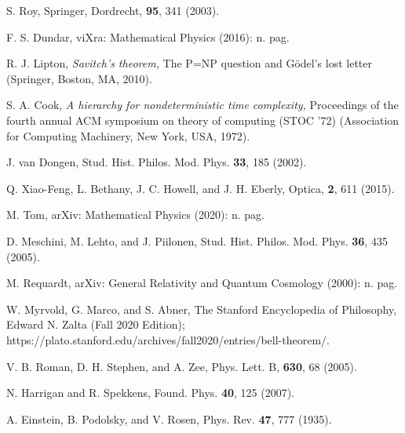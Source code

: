 \documentclass{article}
\begin{document}
\begin{thebibliography}{6}
S. Roy,   Springer, Dordrecht, {\bf 95}, 341 (2003).

F. S. Dundar,  viXra: Mathematical Physics (2016): n. pag.

R. J. Lipton, {\it Savitch’s theorem,} The P=NP question and Gödel’s lost letter (Springer, Boston, MA, 2010).

S. A. Cook, {\it A hierarchy for nondeterministic time complexity,} Proceedings of the fourth annual ACM symposium on theory of computing (STOC '72) (Association for Computing Machinery, New York, USA, 1972).

J. van Dongen,  Stud. Hist. Philos. Mod. Phys. {\bf 33}, 185 (2002).

Q. Xiao-Feng, L. Bethany, J. C. Howell, and J. H. Eberly,  Optica, {\bf 2}, 611 (2015).

M. Tom,  arXiv: Mathematical Physics (2020): n. pag.

D. Meschini, M. Lehto, and J. Piilonen,   Stud. Hist. Philos. Mod. Phys. {\bf 36}, 435 (2005). 

M. Requardt,  arXiv: General Relativity and Quantum Cosmology (2000): n. pag.

W. Myrvold, G. Marco, and S. Abner,  The Stanford Encyclopedia of Philosophy, Edward N. Zalta (Fall 2020 Edition); https://plato.stanford.edu/archives/fall2020/entries/bell-theorem/.

V. B. Roman, D. H. Stephen, and A. Zee,  Phys. Lett. B, {\bf 630}, 68 (2005). 

N. Harrigan and R. Spekkens,  Found. Phys. {\bf 40}, 125 (2007).

A. Einstein, B. Podolsky, and V. Rosen,  Phys. Rev. {\bf47}, 777 (1935).
\end{thebibliography}


 
\end{document}

